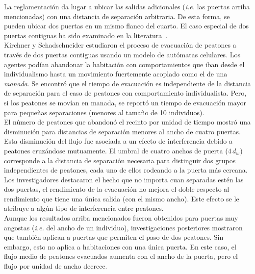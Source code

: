 \noindent La reglamentación da lugar a ubicar las salidas adicionales (\emph{i.e.} las puertas arriba mencionadas) con una distancia de separación arbitraria. De esta forma, se pueden ubicar dos puertas en un mismo flanco del cuarto. El caso especial de dos puertas contiguas ha sido examinado en la literatura~\cite{kirchner1,perez1,daoliang1,huanhuan1}. \\

\noindent Kirchner y Schadschneider estudiaron el proceso de evacuación de peatones a través de dos puertas contiguas usando un modelo de autómatas celulares\cite{kirchner1}. Los agentes podían abandonar la habitación con comportamientos que iban desde el individualismo hasta un movimiento fuertemente acoplado como el de una \emph{manada}. Se encontró que el tiempo de evacuación es independiente de la distancia de separación para el caso de peatones con comportamiento individualista. Pero, si los peatones se movían en manada, se reportó un tiempo de evacuación mayor para pequeñas separaciones (menores al tamaño de 10 individuos).\\

\noindent El número de peatones que abandonó el recinto por unidad de tiempo mostró una disminución para distancias de separación menores al ancho de cuatro puertas\cite{perez1}. Esta disminución del flujo fue asociada a un efecto de interferencia debido a peatones cruzándose mutuamente. El umbral de cuatro anchos de puerta ($4\,d_w$) corresponde a la distancia de separación necesaria para distinguir dos  grupos independientes de peatones, cada uno de ellos rodeando a la puerta más cercana. \\

\noindent Los investigadores destacaron el hecho que no importa cuan separadas estén las dos puertas, el rendimiento de la evacuación no mejora el doble respecto al rendimiento que tiene una única salida (con el mismo ancho). Este efecto se le atribuye a algún tipo de interferencia entre peatones\cite{perez1}.\\

\noindent Aunque los resultados arriba mencionados fueron obtenidos para puertas muy angostas (\emph{i.e.} del ancho de un individuo), investigaciones posteriores mostraron que también aplican a puertas que permiten el paso de dos peatones. Sin embargo, esto no aplica a habitaciones con una única puerta\cite{daoliang1}. En este caso, el flujo medio de peatones evacuados aumenta con el ancho de la puerta, pero el flujo por unidad de ancho decrece\cite{daoliang1}. \\
 
